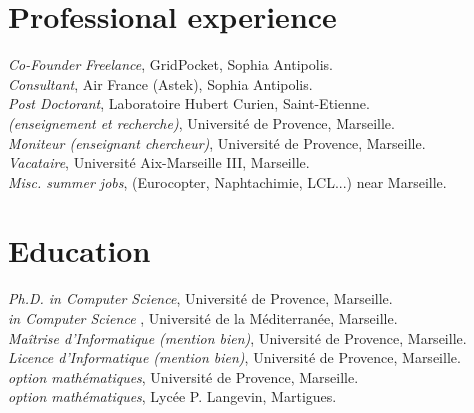 


\reversemarginpar



\titre{}
\afficheContactInfos

\section*{Professional experience}

\noindent{}\emph{Co-Founder} \amper{} \emph{Freelance}, GridPocket, Sophia Antipolis.\\
\noindent{}\emph{Consultant}, Air France (Astek), Sophia Antipolis.\\
\emph{Post Doctorant}, Laboratoire Hubert Curien, Saint-Etienne.\\
\emph{ {\footnotesize (enseignement et recherche)}}, Université de Provence, Marseille.\\
\emph{Moniteur (enseignant \amper{} chercheur)}, Université de Provence, Marseille.\\
\emph{Vacataire}, Université Aix-Marseille III, Marseille.\\
\emph{Misc. summer jobs}, {\footnotesize (Eurocopter, Naphtachimie, LCL...) } near Marseille.

\section*{Education}

\noindent{}\emph{Ph.D. in Computer Science}, Université de Provence, Marseille.\\
\noindent{}\emph{ in Computer Science} , Université de la Méditerranée, Marseille.\\
\noindent{}\emph{Maîtrise d'Informatique {\footnotesize(mention bien)}}, Université de Provence, Marseille.\\
\noindent{}\emph{Licence d'Informatique {\footnotesize(mention bien)}}, Université de Provence, Marseille.\\
\noindent{}\emph{ {\footnotesize option mathématiques}}, Université de Provence, Marseille.\\
\noindent{}\emph{ {\footnotesize option mathématiques}}, Lycée P. Langevin, Martigues.

